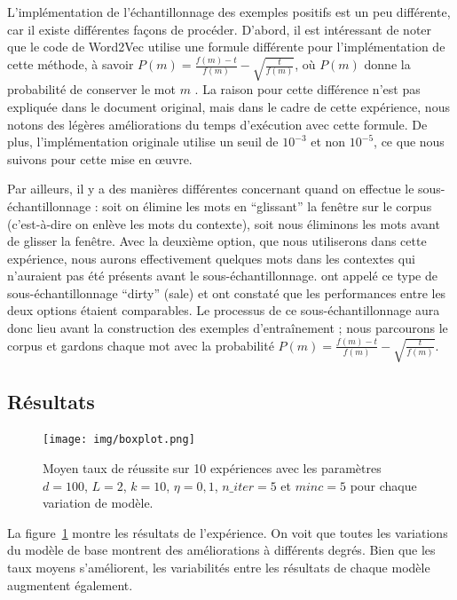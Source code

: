 \documentclass[12pt]{article}
\begin{document}
L'implémentation de l'échantillonnage des exemples positifs est un peu différente, car il existe différentes façons de procéder. D'abord, il est intéressant de noter que le code de Word2Vec utilise une formule différente pour l'implémentation de cette méthode, à savoir $ P(m) = \frac{f(m)-t}{f(m)} - \sqrt{\frac{t}{f(m)}} $, où $P(m)$ donne la probabilité de conserver le mot $m$ \citep{word2vec_source}. La raison pour cette différence n'est pas expliquée dans le document original, mais dans le cadre de cette expérience, nous notons des légères améliorations du temps d'exécution avec cette formule. De plus, l'implémentation originale utilise un seuil de $10^{-3}$ et non $10^{-5}$, ce que nous suivons pour cette mise en œuvre.

Par ailleurs, il y a des manières différentes concernant quand on effectue le sous-échantillonnage : soit on élimine les mots en ``glissant'' la fenêtre sur le corpus (c'est-à-dire on enlève les mots du contexte), soit nous éliminons les mots avant de glisser la fenêtre. Avec la deuxième option, que nous utiliserons dans cette expérience, nous aurons effectivement quelques mots dans les contextes qui n'auraient pas été présents avant le sous-échantillonnage. \cite{levy2015improving} ont appelé ce type de sous-échantillonnage ``dirty'' (sale) et ont constaté que les performances entre les deux options étaient comparables. Le processus de ce sous-échantillonnage aura donc lieu avant la construction des exemples d'entraînement ; nous parcourons le corpus et gardons chaque mot avec la probabilité $ P(m) = \frac{f(m)-t}{f(m)} - \sqrt{\frac{t}{f(m)}} $.

\subsection{Résultats} \label{résultats-1}

\begin{figure}[htpb]
    \centering
    \texttt{[image: img/boxplot.png]}
    \caption{Moyen taux de réussite sur 10 expériences avec les paramètres $d=100$, $L=2$, $k=10$, $\eta=0{,}1$, $n\_ iter=5$ et $minc=5$ pour chaque variation de modèle.}
    \label{fig:boxplot}
\end{figure}

La figure~\ref{fig:boxplot} montre les résultats de l'expérience. On voit que toutes les variations du modèle de base montrent des améliorations à différents degrés. Bien que les taux moyens s'améliorent, les variabilités entre les résultats de chaque modèle augmentent également. 
\end{document}
